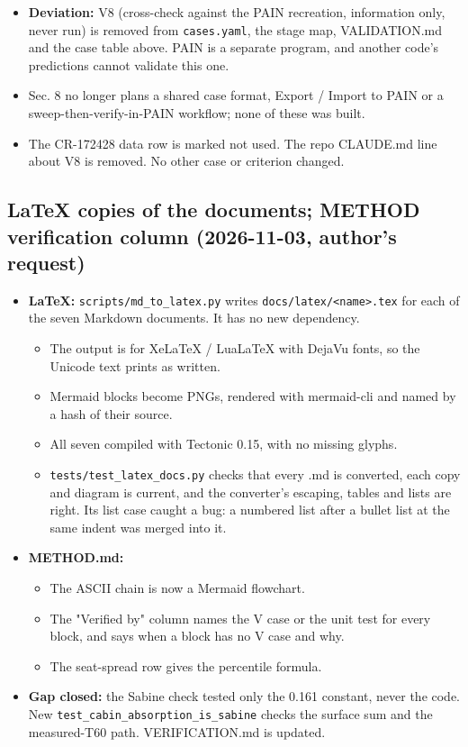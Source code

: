 \documentclass[10pt,a4paper]{article}
\begin{document}
\begin{itemize}
\item \textbf{Deviation:} V8 (cross-check against the PAIN recreation, information only, never run) is removed from \texttt{cases.\allowbreak{}yaml}, the stage map, VALIDATION.md and the case table above. PAIN is a separate program, and another code's predictions cannot validate this one.
\item Sec. 8 no longer plans a shared case format, Export / Import to PAIN or a sweep-then-verify-in-PAIN workflow; none of these was built.
\item The CR-172428 data row is marked not used. The repo CLAUDE.md line about V8 is removed. No other case or criterion changed.
\end{itemize}

\subsection*{LaTeX copies of the documents; METHOD verification column (2026-11-03, author's request)}

\begin{itemize}
\item \textbf{LaTeX:} \texttt{scripts/\allowbreak{}md\_\allowbreak{}to\_\allowbreak{}latex.\allowbreak{}py} writes \texttt{docs/\allowbreak{}latex/\allowbreak{}<name>.\allowbreak{}tex} for each of the seven Markdown documents. It has no new dependency.
\begin{itemize}
\item The output is for XeLaTeX / LuaLaTeX with DejaVu fonts, so the Unicode text prints as written.
\item Mermaid blocks become PNGs, rendered with mermaid-cli and named by a hash of their source.
\item All seven compiled with Tectonic 0.15, with no missing glyphs.
\item \texttt{tests/\allowbreak{}test\_\allowbreak{}latex\_\allowbreak{}docs.\allowbreak{}py} checks that every .md is converted, each copy and diagram is current, and the converter's escaping, tables and lists are right. Its list case caught a bug: a numbered list after a bullet list at the same indent was merged into it.
\end{itemize}
\item \textbf{METHOD.md:}
\begin{itemize}
\item The ASCII chain is now a Mermaid flowchart.
\item The "Verified by" column names the V case or the unit test for every block, and says when a block has no V case and why.
\item The seat-spread row gives the percentile formula.
\end{itemize}
\item \textbf{Gap closed:} the Sabine check tested only the 0.161 constant, never the code. New \texttt{test\_\allowbreak{}cabin\_\allowbreak{}absorption\_\allowbreak{}is\_\allowbreak{}sabine} checks the surface sum and the measured-T60 path. VERIFICATION.md is updated.
\end{itemize}
\end{document}
